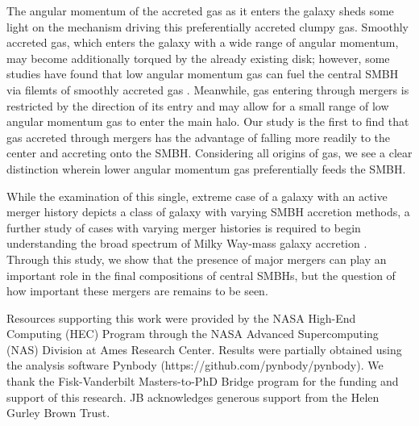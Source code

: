 \documentclass[]{emulateapj}
\begin{document}
The angular momentum of the accreted gas as it enters the galaxy sheds some light on the mechanism driving this preferentially accreted clumpy gas. Smoothly accreted gas, which enters the galaxy with a wide range of angular momentum, may become additionally torqued by the already existing disk; however, some studies have found that low angular momentum gas can fuel the central SMBH via filemts of smoothly accreted gas \citep{Dubois2012,DiMatteo2016}. Meanwhile, gas entering through mergers is restricted by the direction of its entry and may allow for a small range of low angular momentum gas to enter the main halo. Our study is the first to find that gas accreted through mergers has the advantage of falling more readily to the center and accreting onto the SMBH. Considering all origins of gas, we see a clear distinction wherein lower angular momentum gas preferentially feeds the SMBH.

While the examination of this single, extreme case of a galaxy with an active merger history depicts a class of galaxy with varying SMBH accretion methods, a further study of cases with varying merger histories is required to begin understanding the broad spectrum of Milky Way-mass galaxy accretion \citep{Pontzen2016}. Through this study, we show that the presence of major mergers can play an important role in the final compositions of central SMBHs, but the question of how important these mergers are remains to be seen.



\acknowledgments
Resources supporting this work were provided by the NASA High-End Computing (HEC) Program through the NASA Advanced Supercomputing (NAS) Division at Ames Research Center. Results were partially obtained using the analysis software Pynbody (https://github.com/pynbody/pynbody). We thank the Fisk-Vanderbilt Masters-to-PhD Bridge program for the funding and support of this research. JB acknowledges generous support from the Helen Gurley Brown Trust.


\end{document}
